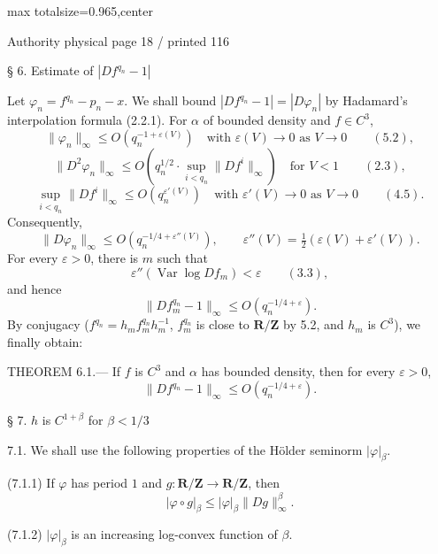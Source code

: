 \documentclass{article}
\begin{document}
\newpage
\noindent\begin{adjustbox}{max totalsize={\textwidth}{0.965\textheight},center}\begin{minipage}{\textwidth}
\noindent\hfill\scriptsize Authority physical page 18 / printed 116\par\normalsize
§ 6. Estimate of \(\left|Df^{q_n}-1\right|\)

Let \(\varphi_n=f^{q_n}-p_n-x\). We shall bound \(\left|Df^{q_n}-1\right|=|D\varphi_n|\) by Hadamard’s interpolation formula (2.2.1). For \(\alpha\) of bounded density and \(f\in C^3\),
\[
\|\varphi_n\|_\infty\leq O\!\left(q_n^{-1+\varepsilon(V)}\right)
\quad\text{with }\varepsilon(V)\to0\text{ as }V\to0 \qquad(5.2),
\]
\[
\|D^2\varphi_n\|_\infty\leq O\!\left(q_n^{1/2}\cdot
\sup_{i<q_n}\|Df^i\|_\infty\right)
\quad\text{for }V<1 \qquad(2.3),
\]
\[
\sup_{i<q_n}\|Df^i\|_\infty\leq O\!\left(q_n^{\varepsilon'(V)}\right)
\quad\text{with }\varepsilon'(V)\to0\text{ as }V\to0 \qquad(4.5).
\]
Consequently,
\[
\|D\varphi_n\|_\infty\leq O\!\left(q_n^{-1/4+\varepsilon''(V)}\right),
\qquad \varepsilon''(V)=\tfrac12(\varepsilon(V)+\varepsilon'(V)).
\]
For every \(\varepsilon>0\), there is \(m\) such that
\[
\varepsilon''(\operatorname{Var}\log Df_m)<\varepsilon\qquad(3.3),
\]
and hence
\[
\|Df_m^{q_n}-1\|_\infty\leq O\!\left(q_n^{-1/4+\varepsilon}\right).
\]
By conjugacy (\(f^{q_n}=h_mf_m^{q_n}h_m^{-1}\), \(f_m^{q_n}\) is close to \(\mathbf R/\mathbf Z\) by 5.2, and \(h_m\) is \(C^3\)), we finally obtain:

THEOREM 6.1.— If \(f\) is \(C^3\) and \(\alpha\) has bounded density, then for every \(\varepsilon>0\),
\[
\|Df^{q_n}-1\|_\infty\leq O\!\left(q_n^{-1/4+\varepsilon}\right).
\]

§ 7. \(h\) is \(C^{1+\beta}\) for \(\beta<1/3\)

7.1. We shall use the following properties of the Hölder seminorm \(|\varphi|_\beta\).

(7.1.1) If \(\varphi\) has period \(1\) and \(g:\mathbf R/\mathbf Z\to\mathbf R/\mathbf Z\), then
\[
|\varphi\circ g|_\beta\leq|\varphi|_\beta\|Dg\|_\infty^\beta.
\]

(7.1.2) \(|\varphi|_\beta\) is an increasing log-convex function of \(\beta\).
\end{minipage}\end{adjustbox}
\end{document}
